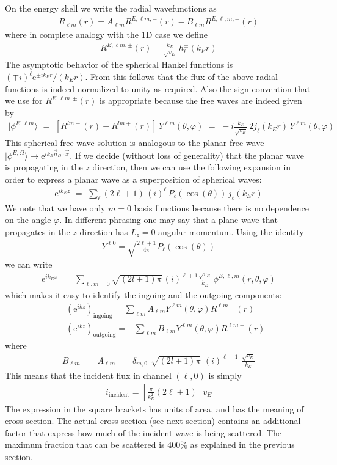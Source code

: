 \documentclass[onecolumn,fleqn, 11pt]{revtex4}
\newcommand{\eexp}{\mathrm{e}^}
\newcommand{\tbox}[1]{\text{#1}}
\newcommand{\beq}{\begin{eqnarray}}
\newcommand{\eeq}{\end{eqnarray}}
\begin{document}
On the energy shell we write the radial wavefunctions as 
\beq
R_{\ell m}(r) = A_{\ell m} R^{E,\ell m,-}(r) - B_{\ell m} R^{E,\ell,m,+}(r)
\eeq
where in complete analogy with the 1D case we define 
\beq
R^{E,\ell m,\pm}(r) = \frac{k_E}{\sqrt{v_E}} \ h_{\ell}^{\pm} (k_E r)
\eeq
The asymptotic behavior of the spherical Hankel functions 
is $(\mp i)^{\ell} \eexp{\pm i k_Er}/(k_Er)$. 
From this follows that the flux of the above radial functions 
is indeed normalized to unity as required.
Also the sign convention that we use for $R^{E,\ell m,\pm}(r)$ 
is appropriate because the free waves are indeed given by 
\beq
|\phi^{E,\ell m}\rangle 
\,\,=\,\,
[R^{lm-}(r)-R^{lm+}(r)] \, Y^{\ell m}(\theta,\varphi) 
\,\,=\,\,
-i\frac{k_E}{\sqrt{v_E}} \, 2j_{\ell}(k_Er) \, Y^{\ell m}(\theta,\varphi) 
\eeq
This spherical free wave solution is analogous to the planar 
free wave ${|\phi^{E,\Omega}\rangle \mapsto \eexp{ik_E\vec{n}_\Omega\cdot\vec{x}}}$.
If we decide (without loss of generality) 
that the planar wave is propagating in the $z$ direction,  
then we can use the following expansion in order 
to express a planar wave as a superposition of spherical waves:  
\beq
\eexp{ik_E z} \,\,=\,\, 
\sum_{\ell}(2\ell+1) \, (i)^{\ell} \, P_{\ell}( \cos(\theta) ) \, j_{\ell}(k_Er)
\eeq
We note that we have only $m=0$ basis functions because there 
is no dependence on the angle $\varphi$.  In different phrasing  
one may say that a plane wave that propagates in the $z$ direction 
has $L_z=0$ angular momentum. Using the identity
\beq
Y^{\ell 0} = \sqrt{\frac{2\ell+1}{4\pi}} P_{\ell}(\cos(\theta))
\eeq
we can write 
\beq
\eexp{ik_E z} \,\,=\,\, 
\sum_{\ell,m=0}\sqrt{(2l+1)\pi} 
\, (i)^{\ell{+}1}  \frac{\sqrt{v_E}}{k_E}   
\, \phi^{E,\ell,m}(r,\theta, \varphi)
\eeq
which makes it easy to identify the ingoing 
and the outgoing components: 
\beq
&& (\eexp{ikz})_{\tbox{ingoing}} 
= \sum_{\ell m} A_{\ell m} Y^{\ell m}(\theta,\varphi) R^{\ell m-}(r) 
\\ \nonumber
&& (\eexp{ikz})_{\tbox{outgoing}} 
= -\sum_{\ell m} B_{\ell m} Y^{\ell m}(\theta,\varphi) R^{\ell m+}(r)
\eeq
where
\beq
B_{\ell m} \,\,=\,\, A_{\ell m} \,\,=\,\,  
\delta_{m,0} 
\,\, \sqrt{(2l+1)\pi} 
\,\, (i)^{\ell{+}1} 
\,\, \frac{\sqrt{v_E}}{k_E}
\eeq
This means that the incident flux in channel $(\ell,0)$ is simply
\beq
i_{\tbox{incident}} = \left[ \frac{\pi}{k_E^2} (2\ell+1) \right] v_E
\eeq
The expression in the square brackets has 
units of area, and has the meaning of cross section.
The actual cross section (see next section) contains  
an additional factor that express how much 
of the incident wave is being scattered. 
The maximum fraction that can be scattered is $400\%$ 
as explained in the previous section.
\end{document}

